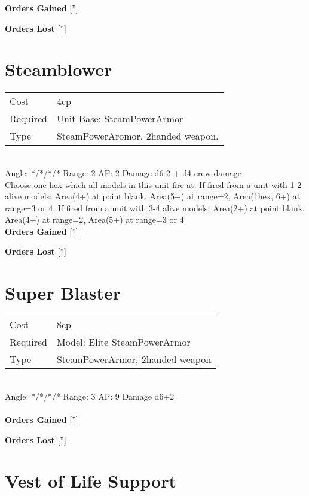 {\bf Orders Gained}
['']

{\bf Orders Lost}
['']
\section{ Steamblower }

\begin{tabular}{ll}
    Cost & 4cp \\
    Required & Unit Base: SteamPowerArmor\\
    Type & SteamPowerAromor, 2handed weapon.\\
\end{tabular}
\ \\
\indent Angle: */*/*/* Range: 2  AP: 2 Damage d6-2 + d4 crew damage \\
Choose one hex which all models in this unit fire at. If fired from a unit with 1-2 alive models: Area(4+) at point blank, Area(5+) at range=2, Area(1hex, 6+) at range=3 or 4. If fired from a unit with 3-4 alive models: Area(2+) at point blank, Area(4+) at range=2, Area(5+) at range=3 or 4
\ \\

{\bf Orders Gained}
['']

{\bf Orders Lost}
['']
\section{ Super Blaster }

\begin{tabular}{ll}
    Cost & 8cp \\
    Required & Model: Elite SteamPowerArmor\\
    Type & SteamPowerArmor, 2handed weapon\\
\end{tabular}
\ \\
\indent Angle: */*/*/* Range: 3  AP: 9 Damage d6+2 \\

\ \\

{\bf Orders Gained}
['']

{\bf Orders Lost}
['']
\section{ Vest of Life Support }

